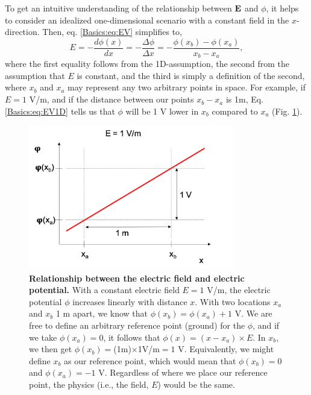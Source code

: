 To get an intuitive understanding of the relationship between ${\bf E}$ and $\phi$, it helps to consider an idealized one-dimensional scenario with a constant field in the $x$-direction. Then, eq. \ref{Basics:eq:EV} simplifies to,
\begin{equation}
E = -\frac{d\phi(x)}{dx} = -\frac{\Delta \phi}{\Delta x} = -\frac{\phi(x_b)-\phi(x_a)}{x_b-x_a},
\label{Basics:eq:EV1D}
\end{equation}
where the first equality follows from the 1D-assumption, the second from the assumption that $E$ is constant, and the third is simply a definition of the second, where $x_b$ and $x_a$ may represent any two arbitrary points in space. For example, if $E = 1$ V/m, and if the distance between our points $x_b-x_a$ is 1m, Eq. \ref{Basics:eq:EV1D} tells us that $\phi$ will be 1 V  lower in $x_b$ compared to $x_a$ (Fig. \ref{Basics:fig:Ground}).

\begin{figure}[!ht]
\begin{center}
\includegraphics[width=0.8\textwidth]{Figures/Basics/Ground.png}
\end{center}
\caption{\textbf{Relationship between the electric field and electric potential.} With a constant electric field $E = 1$ V/m, the electric potential $\phi$ increases linearly with distance $x$. With two locations $x_a$ and $x_b$ 1 m apart, we know that $\phi(x_b) = \phi(x_a) + 1$ V. We are free to define an arbitrary reference point (ground) for the $\phi$, and if we take $\phi(x_a) = 0$, it follows that $\phi(x) = (x-x_a) \times E$. In $x_b$, we then get $\phi(x_b)=$(1m)$\times$1V/m$=1$ V. Equivalently, we might define $x_b$ as our reference point, which would mean that $\phi(x_b) = 0$ and $\phi(x_a) = -1$ V. Regardless of where we place our reference point, the physics (i.e., the field, $E$) would be the same.
}
\label{Basics:fig:Ground}
\end{figure}


